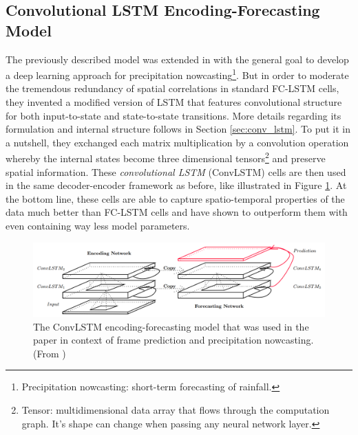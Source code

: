\subsection{Convolutional LSTM Encoding-Forecasting Model} \label{sec:related-convlstm}

The previously described model was extended in \parencite{conv_lstm_nowcasting} with the general goal to develop a deep learning approach for precipitation nowcasting\footnote{Precipitation nowcasting: short-term forecasting of rainfall.}. But in order to moderate the tremendous redundancy of spatial correlations in standard FC-LSTM cells, they invented a modified version of LSTM that features convolutional structure for both input-to-state and state-to-state transitions. More details regarding its formulation and internal structure follows in Section \ref{sec:conv_lstm}. To put it in a nutshell, they exchanged each matrix multiplication by a convolution operation whereby the internal states become three dimensional tensors\footnote{Tensor: multidimensional data array that flows through the computation graph. It's shape can change when passing any neural network layer.} and preserve spatial information. These \textit{convolutional LSTM} (ConvLSTM) cells are then used in the same decoder-encoder framework as before, like illustrated in Figure \ref{fig:convlstm_model}. At the bottom line, these cells are able to capture spatio-temporal properties of the data much better than FC-LSTM cells and have shown to outperform them with even containing way less model parameters.

\begin{figure}[htb]
	\centering
	\includegraphics[width=0.8\linewidth]{figures/related/nowcasting_model.png} 
	\caption[ConvLSTM Encoding-Forecasting Model]{The ConvLSTM encoding-forecasting model that was used in the paper in context of frame prediction and precipitation nowcasting. (From \parencite{conv_lstm_nowcasting})} \label{fig:convlstm_model}
\end{figure}

